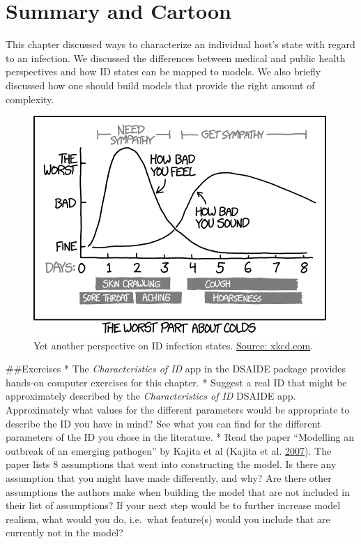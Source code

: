 \documentclass[]{book}
\theoremstyle{definition}
\theoremstyle{definition}
\theoremstyle{definition}
\theoremstyle{remark}
\begin{document}
\hypertarget{summary-and-cartoon}{%
\section{Summary and Cartoon}\label{summary-and-cartoon}}

This chapter discussed ways to characterize an individual host's state
with regard to an infection. We discussed the differences between
medical and public health perspectives and how ID states can be mapped
to models. We also briefly discussed how one should build models that
provide the right amount of complexity.

\begin{figure}
\centering
\includegraphics{./images/xkcd-course-of-colds.png}
\caption{\label{fig:coldcourse}Yet another perspective on ID infection
states. \href{https://xkcd.com/1612/}{Source: xkcd.com}.}
\end{figure}

\#\#Exercises * The \emph{Characteristics of ID} app in the DSAIDE
package provides hands-on computer exercises for this chapter. * Suggest
a real ID that might be approximately described by the
\emph{Characteristics of ID} DSAIDE app. Approximately what values for
the different parameters would be appropriate to describe the ID you
have in mind? See what you can find for the different parameters of the
ID you chose in the literature. * Read the paper ``Modelling an outbreak
of an emerging pathogen'' by Kajita et al (Kajita et al.
\protect\hyperlink{ref-kajita07}{2007}). The paper lists 8 assumptions
that went into constructing the model. Is there any assumption that you
might have made differently, and why? Are there other assumptions the
authors make when building the model that are not included in their list
of assumptions? If your next step would be to further increase model
realism, what would you do, i.e.~what feature(s) would you include that
are currently not in the model?
\end{document}
